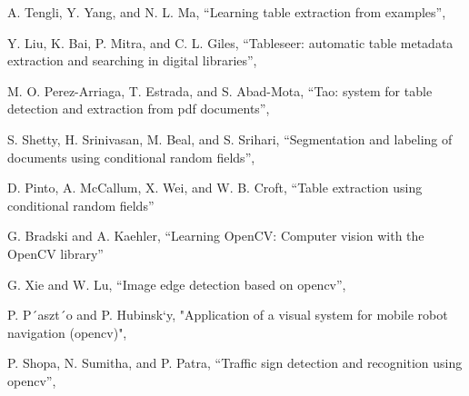 \documentclass[uplatex, twocolumn,10pt]{jsarticle}
\begin{document}
\begin{thebibliography}{99}
    A. Tengli, Y. Yang, and N. L. Ma,
    \newblock “Learning table extraction from examples”,
    
    Y. Liu, K. Bai, P. Mitra, and C. L. Giles,
    \newblock “Tableseer: automatic table metadata extraction and searching in digital libraries”,
    
    M. O. Perez-Arriaga, T. Estrada, and S. Abad-Mota,
    \newblock “Tao: system for table detection and extraction from pdf documents”,

    S. Shetty, H. Srinivasan, M. Beal, and S. Srihari,
    \newblock “Segmentation and labeling of documents using conditional random fields”,

    D. Pinto, A. McCallum, X. Wei, and W. B. Croft,
    \newblock “Table extraction using conditional random fields”
    
    G. Bradski and A. Kaehler,
    \newblock “Learning OpenCV: Computer vision with the OpenCV library”

    G. Xie and W. Lu,
    \newblock “Image edge detection based on opencv”,

    P. P´aszt´o and P. Hubinsk`y,
    \newblock "Application of a visual system for mobile robot navigation (opencv)",
    
    P. Shopa, N. Sumitha, and P. Patra,
    \newblock “Traffic sign detection and recognition using opencv”,


\end{thebibliography}
\end{document}
